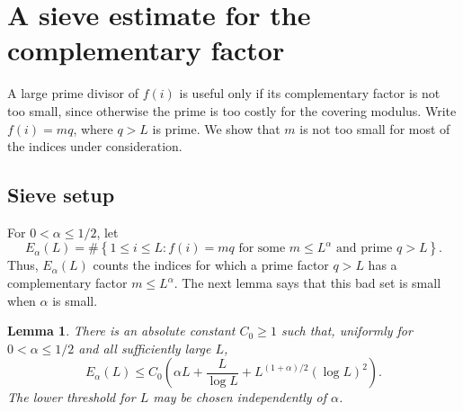 \documentclass[11pt]{amsart}
\newtheorem{lemma}[theorem]{Lemma}
\theoremstyle{definition}
\theoremstyle{remark}
\begin{document}
\section{A sieve estimate for the complementary factor}

A large prime divisor of $f(i)$ is useful only if its complementary factor
is not too small, since otherwise the prime is too costly for the covering
modulus.  Write $f(i)=mq$, where $q>L$ is prime.  We show that $m$ is not too
small for most of the indices under consideration.

\subsection{Sieve setup}

For $0<\alpha\leq1/2$, let
\[
E_\alpha(L)
=
\#\left\{1\leq i\leq L:
 f(i)=mq\text{ for some }m\leq L^\alpha
 \text{ and prime }q>L
\right\}.
\]
Thus, $E_\alpha(L)$ counts the indices for which a prime factor $q>L$ has a
complementary factor $m\leq L^\alpha$.  The next lemma says that this bad set
is small when $\alpha$ is small.

\begin{lemma}\label{lem:smallcofactor}
There is an absolute constant $C_0\geq1$ such that, uniformly for $0<\alpha\leq1/2$ and all sufficiently large $L$,
\[
E_\alpha(L)
\leq
C_0\left(
\alpha L+\frac{L}{\log L}
+L^{(1+\alpha)/2}(\log L)^2
\right).
\]
The lower threshold for $L$ may be chosen independently of $\alpha$.
\end{lemma}
\end{document}
